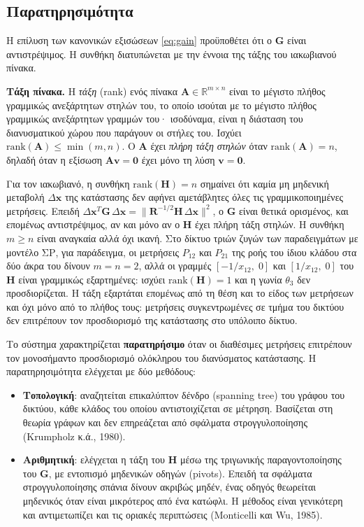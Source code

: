 \subsection{Παρατηρησιμότητα}
\label{sec:observability}

Η επίλυση των κανονικών εξισώσεων \eqref{eq:gain} προϋποθέτει ότι ο $\mathbf{G}$ είναι
αντιστρέψιμος. Η συνθήκη διατυπώνεται με την έννοια της τάξης του ιακωβιανού πίνακα.

\textbf{Τάξη πίνακα.} Η \emph{τάξη} (rank) ενός πίνακα $\mathbf{A} \in \mathbb{R}^{m \times n}$
είναι το μέγιστο πλήθος γραμμικώς ανεξάρτητων στηλών του, το οποίο ισούται με το μέγιστο
πλήθος γραμμικώς ανεξάρτητων γραμμών του· ισοδύναμα, είναι η διάσταση του διανυσματικού χώρου
που παράγουν οι στήλες του. Ισχύει $\mathrm{rank}(\mathbf{A}) \le \min(m, n)$. Ο $\mathbf{A}$
έχει \emph{πλήρη τάξη στηλών} όταν $\mathrm{rank}(\mathbf{A}) = n$, δηλαδή όταν η εξίσωση
$\mathbf{A}\mathbf{v} = \mathbf{0}$ έχει μόνο τη λύση $\mathbf{v} = \mathbf{0}$.

Για τον ιακωβιανό, η συνθήκη $\mathrm{rank}(\mathbf{H}) = n$ σημαίνει ότι καμία μη μηδενική
μεταβολή $\Delta\mathbf{x}$ της κατάστασης δεν αφήνει αμετάβλητες όλες τις γραμμικοποιημένες
μετρήσεις. Επειδή
$\Delta\mathbf{x}^{T}\mathbf{G}\,\Delta\mathbf{x} = \|\mathbf{R}^{-1/2}\mathbf{H}\,\Delta\mathbf{x}\|^{2}$,
ο $\mathbf{G}$ είναι θετικά ορισμένος, και επομένως αντιστρέψιμος, αν και μόνο αν ο
$\mathbf{H}$ έχει πλήρη τάξη στηλών. Η συνθήκη $m \ge n$ είναι αναγκαία αλλά όχι ικανή. Στο
δίκτυο τριών ζυγών των παραδειγμάτων με μοντέλο ΣΡ, για παράδειγμα, οι μετρήσεις $P_{12}$ και
$P_{21}$ της ροής του ίδιου κλάδου στα δύο άκρα του δίνουν $m = n = 2$, αλλά οι γραμμές
$[-1/x_{12},\; 0]$ και $[1/x_{12},\; 0]$ του $\mathbf{H}$ είναι γραμμικώς εξαρτημένες: ισχύει
$\mathrm{rank}(\mathbf{H}) = 1$ και η γωνία $\theta_3$ δεν προσδιορίζεται. Η τάξη εξαρτάται
επομένως από τη θέση και το είδος των μετρήσεων και όχι μόνο από το πλήθος τους: μετρήσεις
συγκεντρωμένες σε τμήμα του δικτύου δεν επιτρέπουν τον προσδιορισμό της κατάστασης στο
υπόλοιπο δίκτυο.

Το σύστημα χαρακτηρίζεται \textbf{παρατηρήσιμο} όταν οι διαθέσιμες μετρήσεις επιτρέπουν τον
μονοσήμαντο προσδιορισμό ολόκληρου του διανύσματος κατάστασης. Η παρατηρησιμότητα ελέγχεται
με δύο μεθόδους:

\begin{itemize}
\item \textbf{Τοπολογική}: αναζητείται επικαλύπτον δένδρο (spanning tree) του γράφου του
      δικτύου, κάθε κλάδος του οποίου αντιστοιχίζεται σε μέτρηση. Βασίζεται στη θεωρία
      γράφων και δεν επηρεάζεται από σφάλματα στρογγυλοποίησης (Krumpholz κ.ά., 1980).
\item \textbf{Αριθμητική}: ελέγχεται η τάξη του $\mathbf{H}$ μέσω της τριγωνικής
      παραγοντοποίησης του $\mathbf{G}$, με εντοπισμό μηδενικών οδηγών (pivots). Επειδή τα
      σφάλματα στρογγυλοποίησης σπάνια δίνουν ακριβώς μηδέν, ένας οδηγός θεωρείται μηδενικός
      όταν είναι μικρότερος από ένα κατώφλι. Η μέθοδος είναι γενικότερη και αντιμετωπίζει και
      τις οριακές περιπτώσεις (Monticelli και Wu, 1985).
\end{itemize}

